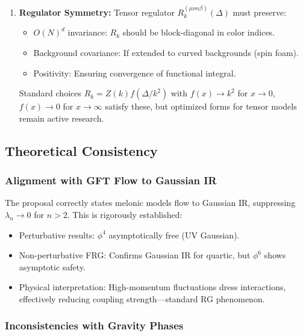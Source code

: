 \documentclass[12pt,a4paper]{article}
\begin{document}
\begin{enumerate}
\item \textbf{Regulator Symmetry:} Tensor regulator \(R_k^{(\mu\nu\alpha\beta)}(\Delta)\) must preserve:
\begin{itemize}
\item \(O(N)^d\) invariance: \(R_k\) should be block-diagonal in color indices.
\item Background covariance: If extended to curved backgrounds (spin foam).
\item Positivity: Ensuring convergence of functional integral.
\end{itemize}

Standard choices \(R_k = Z(k)f(\Delta/k^2)\) with \(f(x) \to k^2\) for \(x \to 0\), \(f(x) \to 0\) for \(x \to \infty\) satisfy these, but optimized forms for tensor models remain active research.
\end{enumerate}

\subsection{Theoretical Consistency}

\subsubsection{Alignment with GFT Flow to Gaussian IR}

The proposal correctly states melonic models flow to Gaussian IR, suppressing \(\lambda_n \to 0\) for \(n > 2\). This is rigorously established:

\begin{itemize}
\item Perturbative results: \(\phi^4\) asymptotically free (UV Gaussian).
\item Non-perturbative FRG: Confirms Gaussian IR for quartic, but \(\phi^6\) shows asymptotic safety.
\item Physical interpretation: High-momentum fluctuations dress interactions, effectively reducing coupling strength—standard RG phenomenon.
\end{itemize}

\subsubsection{Inconsistencies with Gravity Phases}
\end{document}
